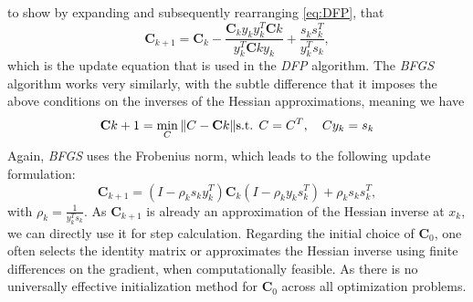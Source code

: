     to show by expanding and subsequently rearranging \ref{eq:DFP}, that
\begin{equation}
\mathbf{C}_{k+1} = \mathbf{C}_k - \frac{\mathbf{C}_k y_k y_k^T \mathbf{C}k}{y_k^T \mathbf{C}k y_k} + \frac{s_k s_k^T}{y_k^T s_k},
\end{equation}
which is the update equation that is used in the \emph{DFP} algorithm.
The \emph{BFGS} algorithm works very similarly, with the subtle difference that it imposes the above conditions on the inverses of the Hessian approximations, meaning we have
\begin{equation}
\mathbf{C}{k+1} = \min_{C} \|C - \mathbf{C}k\| \\\text{s.t. } C = C^T, \quad Cy_k = s_k
\end{equation}
Again, \emph{BFGS} uses the Frobenius norm, which leads to the following update formulation:
\begin{equation}
\mathbf{C}_{k+1} = (I - \rho_k s_k y_k^T)  \mathbf{C}_k(I - \rho_k y_k s_k^T) + \rho_k s_k s_k^T,
\end{equation}
with $\rho_k = \frac{1}{y_k^T s_k}$. As $\mathbf{C}_{k+1}$ is already an approximation of the Hessian inverse at 
$x_k$, we can directly use it for step calculation. Regarding the initial choice of $\mathbf{C}_0$, one often selects the identity matrix
or approximates the Hessian inverse using finite differences on the gradient, when computationally feasible.
As there is no universally effective initialization method for $\mathbf{C}_0$ across all optimization problems.


